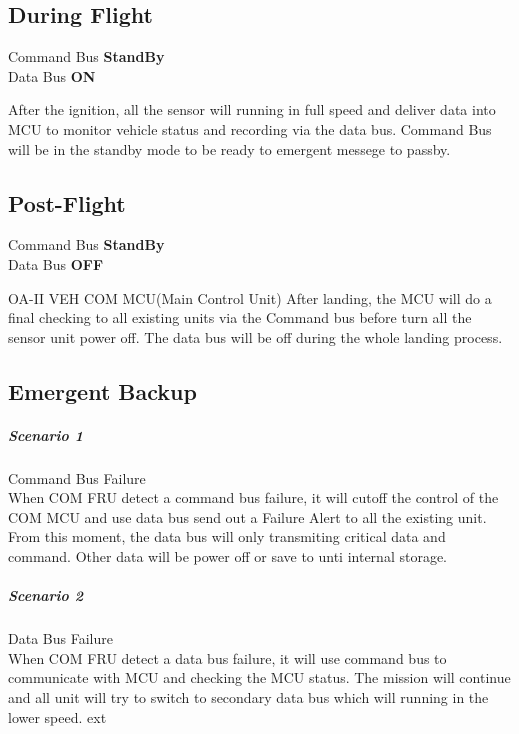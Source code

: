 \documentclass[12pt,article]{memoir}
\begin{document}
\subsection{During Flight}
\begin{center}
Command Bus \textbf{StandBy}\\
Data Bus \textbf{ON}
\end{center}
After the ignition, all the sensor will running in full speed and deliver data into MCU to monitor vehicle status and recording via the data bus. Command Bus will be in the standby mode to be ready to emergent messege to passby.
\subsection{Post-Flight}
\begin{center}
Command Bus \textbf{StandBy}\\
Data Bus \textbf{OFF}
\end{center}OA-II VEH COM MCU(Main Control Unit)
After landing, the MCU will do a final checking to all existing units via the Command bus before turn all the sensor unit power off. The data bus will be off during the whole landing process.
\subsection{Emergent Backup}
\subparagraph{Scenario 1}Command Bus Failure \\
When COM FRU detect a command bus failure, it will cutoff the control of the COM MCU and use data bus send out a Failure Alert to all the existing unit. From this moment, the data bus will only transmiting critical data and command. Other data will be power off or save to unti internal storage.
\subparagraph{Scenario 2 }Data Bus Failure \\
When COM FRU detect a data bus failure, it will use command bus to communicate with MCU and checking the MCU status. The mission will continue and all unit will try to switch to secondary data bus which will running in the lower speed. 
ext
\end{document}
